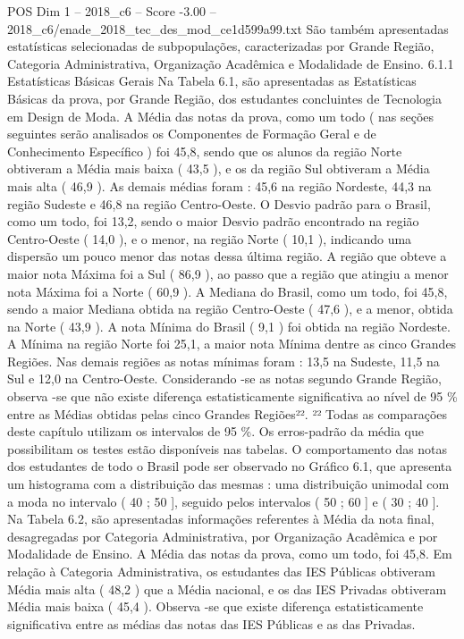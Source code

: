 \begin{textsample}{POS Dim 1 – 2018\_c6 – Score -3.00 – 2018\_c6/enade\_2018\_tec\_des\_mod\_ce1d599a99.txt}
São também apresentadas estatísticas selecionadas de subpopulações, caracterizadas por Grande Região, Categoria Administrativa, Organização Acadêmica e Modalidade de Ensino. 6.1.1 Estatísticas Básicas Gerais Na Tabela 6.1, são apresentadas as Estatísticas Básicas da prova, por Grande Região, dos estudantes concluintes de Tecnologia em Design de Moda.
A Média das notas da prova, como um todo ( nas seções seguintes serão analisados os Componentes de Formação Geral e de Conhecimento Específico ) foi 45,8, sendo que os alunos da região Norte obtiveram a Média mais baixa ( 43,5 ), e os da região Sul obtiveram a Média mais alta ( 46,9 ).
As demais médias foram : 45,6 na região Nordeste, 44,3 na região Sudeste e 46,8 na região Centro-Oeste.
O Desvio padrão para o Brasil, como um todo, foi 13,2, sendo o maior Desvio padrão encontrado na região Centro-Oeste ( 14,0 ), e o menor, na região Norte ( 10,1 ), indicando uma dispersão um pouco menor das notas dessa última região.
A região que obteve a maior nota Máxima foi a Sul ( 86,9 ), ao passo que a região que atingiu a menor nota Máxima foi a Norte ( 60,9 ).
A Mediana do Brasil, como um todo, foi 45,8, sendo a maior Mediana obtida na região Centro-Oeste ( 47,6 ), e a menor, obtida na Norte ( 43,9 ).
A nota Mínima do Brasil ( 9,1 ) foi obtida na região Nordeste.
A Mínima na região Norte foi 25,1, a maior nota Mínima dentre as cinco Grandes Regiões.
Nas demais regiões as notas mínimas foram : 13,5 na Sudeste, 11,5 na Sul e 12,0 na Centro-Oeste.
Considerando -se as notas segundo Grande Região, observa -se que não existe diferença estatisticamente significativa ao nível de 95 \% entre as Médias obtidas pelas cinco Grandes Regiões²². ²² Todas as comparações deste capítulo utilizam os intervalos de 95 \%.
Os erros-padrão da média que possibilitam os testes estão disponíveis nas tabelas.
O comportamento das notas dos estudantes de todo o Brasil pode ser observado no Gráfico 6.1, que apresenta um histograma com a distribuição das mesmas : uma distribuição unimodal com a moda no intervalo ( 40 ; 50 ], seguido pelos intervalos ( 50 ; 60 ] e ( 30 ; 40 ].
Na Tabela 6.2, são apresentadas informações referentes à Média da nota final, desagregadas por Categoria Administrativa, por Organização Acadêmica e por Modalidade de Ensino.
A Média das notas da prova, como um todo, foi 45,8.
Em relação à Categoria Administrativa, os estudantes das IES Públicas obtiveram Média mais alta ( 48,2 ) que a Média nacional, e os das IES Privadas obtiveram Média mais baixa ( 45,4 ).
Observa -se que existe diferença estatisticamente significativa entre as médias das notas das IES Públicas e as das Privadas.

\end{textsample}
